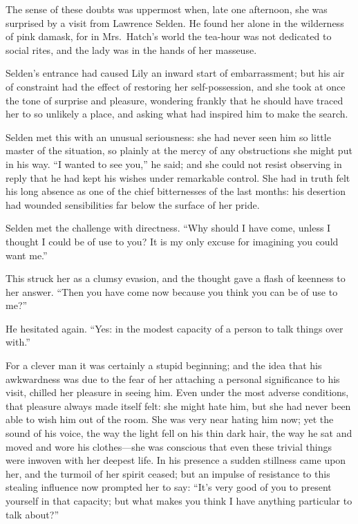\documentclass[12pt,a4paper]{book}
\begin{document}
The sense of these doubts was uppermost when, late one afternoon,
she was surprised by a visit from Lawrence Selden. He found her
alone in the wilderness of pink damask, for in Mrs.\ Hatch's world
the tea-hour was not dedicated to social rites, and the lady was
in the hands of her masseuse.





Selden's entrance had caused Lily an inward start of
embarrassment; but his air of constraint had the effect of
restoring her self-possession, and she took at once the tone of
surprise and pleasure, wondering frankly that he should
have traced her to so unlikely a place, and asking what had
inspired him to make the search.





Selden met this with an unusual seriousness: she had never seen
him so little master of the situation, so plainly at the mercy of
any obstructions she might put in his way. ``I wanted to see you,''
he said; and she could not resist observing in reply that he had
kept his wishes under remarkable control. She had in truth felt
his long absence as one of the chief bitternesses of the last
months: his desertion had wounded sensibilities far below the
surface of her pride.





Selden met the challenge with directness. ``Why should I have
come, unless I thought I could be of use to you? It is my only
excuse for imagining you could want me.''





This struck her as a clumsy evasion, and the thought gave a flash
of keenness to her answer. ``Then you have come now because you
think you can be of use to me?''





He hesitated again. ``Yes: in the modest capacity of a person to
talk things over with.''





For a clever man it was certainly a stupid beginning; and the
idea that his awkwardness was due to the fear of her attaching a
personal significance to his visit, chilled her pleasure in
seeing him. Even under the most adverse conditions, that pleasure
always made itself felt: she might hate him, but she had never
been able to wish him out of the room. She was very near hating
him now; yet the sound of his voice, the way the light fell on
his thin dark hair, the way he sat and moved and wore his
clothes---she was conscious that even these trivial things were
inwoven with her deepest life. In his presence a sudden stillness
came upon her, and the turmoil of her spirit ceased; but an
impulse of resistance to this stealing influence now prompted her
to say: ``It's very good of you to present yourself in that
capacity; but what makes you think I have anything particular to
talk about?''
\end{document}
